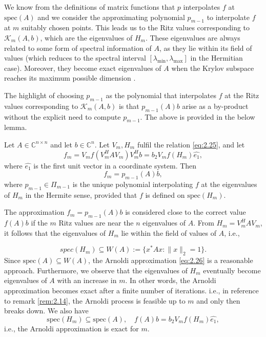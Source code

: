 We know from the definitions of matrix functions that $p$ interpolates $f$ at $\text{spec}(A)$ and we consider the approximating polynomial $p_{m-1}$ to interpolate $f$ at $m$ suitably chosen points. This leads us to the Ritz values corresponding to $\mathcal{K}_m(A, b)$, which are the eigenvalues of $H_m$. These eigenvalues are always related to some form of spectral information of $A$, as they lie within its field of values (which reduces to the spectral interval $[\lambda_{\min}, \lambda_{\max}]$ in the Hermitian case). Moreover, they become exact eigenvalues of $A$ when the Krylov subspace reaches its maximum possible dimension \cite{44}.

The highlight of choosing $p_{m-1}$ as the polynomial that interpolates $f$ at the Ritz values corresponding to $\mathcal{K}_m(A, b)$ is that $p_{m-1}(A)b$ arise as a by-product without the explicit need to compute $p_{m-1}$.
The above is provided in the below lemma.

\begin{lemma}
    \label{lem:2.15}
    \cite{8} Let \( A \in \mathbb{C}^{n \times n} \) and let \( b \in \mathbb{C}^n \). Let \( V_m, H_m \) fulfil the relation \eqref{eq:2.25}, and let
    \begin{equation}
        f_m = V_m f(V_m^H A V_m) V_m^H b = b_2 V_m f(H_m) \hat{e_1},
        \label{eq:2.26}
    \end{equation}
    where $\hat{e_1}$ is the first unit vector in a coordinate system. Then
    \[ f_m = p_{m-1}(A)b,\]
    where \( p_{m-1} \in \Pi_{m-1} \) is the unique polynomial interpolating \( f \) at the eigenvalues of \( H_m \) in the Hermite sense, provided that \( f \) is defined on \( \text{spec}(H_m) \).
\end{lemma}

The approximation $f_m = p_{m-1}(A)b$ is considered close to the correct value $f(A)b$ if the $m$ Ritz values are near the $n$ eigenvalues of $A$. From $H_m = V_m^H A V_m$, it follows that the eigenvalues of $H_m$ lie within the field of values of $A$, i.e.,

\[
    spec(H_m) \subseteq W(A) := \{ x^* A x : \|x\|_2 = 1 \}.
\]
Since $\text{spec}(A) \subseteq W(A)$, the Arnoldi approximation \eqref{eq:2.26} is a reasonable approach. Furthermore, we observe that the eigenvalues of $H_m$ eventually become eigenvalues of $A$ with an increase in $m$. In other words, the Arnoldi approximation becomes exact after a finite number of iterations. i.e., in reference to remark \ref{rem:2.14}, the Arnoldi process is feasible up to $m$ and only then breaks down. We also have
\begin{equation}
    \text{spec}(H_m) \subseteq \text{spec}(A), \quad f(A)b = b_2 V_m f(H_m) \hat{e_1},
    \label{eq:2.27}
\end{equation}
i.e., the Arnoldi approximation is exact for $m$.

